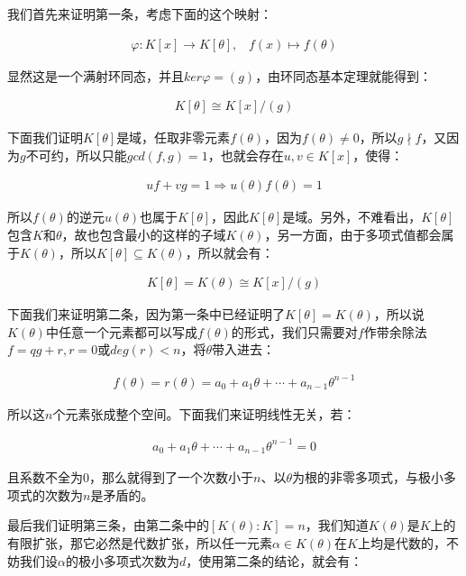 \documentclass[12pt, a4paper, oneside]{ctexart}
\theoremstyle{definition}
\begin{document}
我们首先来证明第一条，考虑下面的这个映射：

\begin{align*}
\varphi:K[x]\rightarrow K[\theta],\;\;\; f(x)\mapsto f(\theta)
\end{align*}

显然这是一个满射环同态，并且$ker\varphi=(g)$，由环同态基本定理就能得到：

\begin{align*}
K[\theta]\cong K[x]/(g)
\end{align*}

下面我们证明$K[\theta]$是域，任取非零元素$f(\theta)$，因为$f(\theta)\neq 0$，所以$g\nmid f$，又因为$g$不可约，所以只能$gcd(f,g)=1$，也就会存在$u,v\in K[x]$，使得：

\begin{align*}
uf+vg=1\Rightarrow u(\theta)f(\theta)=1
\end{align*}

所以$f(\theta)$的逆元$u(\theta)$也属于$K[\theta]$，因此$K[\theta]$是域。另外，不难看出，$K[\theta]$包含$K$和$\theta$，故也包含最小的这样的子域$K(\theta)$，另一方面，由于多项式值都会属于$K(\theta)$，所以$K[\theta]\subseteq K(\theta)$，所以就会有：

\begin{align*}
K[\theta]=K(\theta)\cong K[x]/(g)
\end{align*}

下面我们来证明第二条，因为第一条中已经证明了$K[\theta]=K(\theta)$，所以说$K(\theta)$中任意一个元素都可以写成$f(\theta)$的形式，我们只需要对$f$作带余除法$f=qg+r,r=0$或$deg(r)<n$，将$\theta$带入进去：

\begin{align*}
f(\theta)=r(\theta)=a_0+a_1\theta+\cdots+a_{n-1}\theta^{n-1}
\end{align*}

所以这$n$个元素张成整个空间。下面我们来证明线性无关，若：

\begin{align*}
a_0+a_1\theta+\cdots+a_{n-1}\theta^{n-1}=0
\end{align*}

且系数不全为0，那么就得到了一个次数小于$n$、以$\theta$为根的非零多项式，与极小多项式的次数为$n$是矛盾的。

最后我们证明第三条，由第二条中的$[K(\theta):K]=n$，我们知道$K(\theta)$是$K$上的有限扩张，那它必然是代数扩张，所以任一元素$\alpha\in K(\theta)$在$K$上均是代数的，不妨我们设$\alpha$的极小多项式次数为$d$，使用第二条的结论，就会有：
\end{document}
